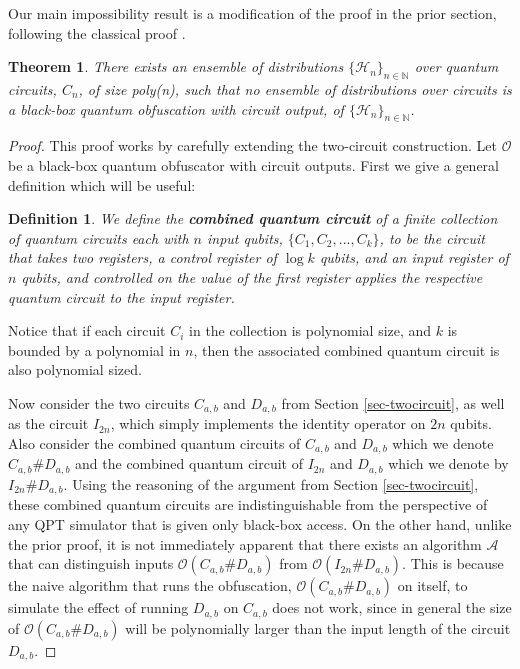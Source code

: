 \documentclass[11pt]{article}
\numberwithin{equation}{section}
\newtheorem{theorem}{Theorem}
\newtheorem{definition}{Definition}
\newcommand{\algo}{\mathcal}
\begin{document}
{Our main impossibility result is a modification of the proof in the prior section, following the classical proof \cite{BGIRSVY12}.
\begin{theorem}
There exists an ensemble of distributions $\lbrace\mathcal{H}_n\rbrace_{n\in\mathbb{N}}$ over quantum circuits, $C_n$, of size poly(n), such that no ensemble of distributions over circuits is a black-box quantum obfuscation with circuit output, of $\lbrace\mathcal{H}_n\rbrace_{n\in\mathbb{N}}$.
\end{theorem}
\begin{proof}
This proof works by carefully extending the two-circuit construction.  Let $\mathcal O$ be a black-box quantum obfuscator with circuit outputs.
First we give a general definition which will be useful:
\begin{definition}We define the {\bf combined quantum circuit} of a finite collection of quantum circuits each with $n$ input qubits, $\lbrace C_1,C_2,...,C_k \rbrace$, to be the circuit that takes two registers, a control register of $\log{k}$ qubits, and an input register of $n$ qubits, and controlled on the value of the first register applies the respective quantum circuit to the input register.   
\end{definition}

Notice that if each circuit $C_i$ in the collection is polynomial size, and $k$ is bounded by a polynomial in $n$, then the associated combined quantum circuit is also polynomial sized.   

Now consider the two circuits  $C_{a,b}$ and $D_{a,b}$ from Section \ref{sec-twocircuit}, as well as the circuit $I_{2n}$, which simply implements the identity operator on $2n$ qubits.  Also consider the combined quantum circuits of $C_{a,b}$ and $D_{a,b}$ which we denote $C_{a,b}\#D_{a,b}$ and the combined quantum circuit of $I_{2n}$ and $D_{a,b}$ which we denote by $I_{2n}\#D_{a,b}$.  Using the reasoning of the argument from Section \ref{sec-twocircuit}, these combined quantum circuits are indistinguishable from the perspective of any QPT simulator that is given only black-box access.  On the other hand, unlike the prior proof, it is not immediately apparent that there exists an algorithm $\algo{A}$ that can distinguish inputs $\algo{O}(C_{a,b}\#D_{a,b})$ from $\algo{O}(I_{2n}\#D_{a,b})$.  This is because the naive algorithm that runs the obfuscation, $\algo{O}(C_{a,b}\#D_{a,b})$ on itself, to simulate the effect of running $D_{a,b}$ on $C_{a,b}$ does not work, since in general the size of $\algo{O}(C_{a,b}\#D_{a,b})$ will be  polynomially larger than the input length of the circuit $D_{a,b}$.


\end{proof}}
\end{document}
